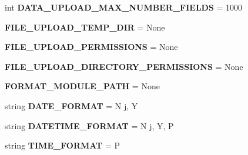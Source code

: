 \begin{DoxyCompactItemize}
int {\bfseries D\+A\+T\+A\+\_\+\+U\+P\+L\+O\+A\+D\+\_\+\+M\+A\+X\+\_\+\+N\+U\+M\+B\+E\+R\+\_\+\+F\+I\+E\+L\+DS} = 1000
\item 
\mbox{\label{namespacedjango_1_1conf_1_1global__settings_aba21f2798fd51fcd1d7528d8f3f74ca1}} 
{\bfseries F\+I\+L\+E\+\_\+\+U\+P\+L\+O\+A\+D\+\_\+\+T\+E\+M\+P\+\_\+\+D\+IR} = None
\item 
\mbox{\label{namespacedjango_1_1conf_1_1global__settings_a77a0343fa3953a447ce867f8fa868dda}} 
{\bfseries F\+I\+L\+E\+\_\+\+U\+P\+L\+O\+A\+D\+\_\+\+P\+E\+R\+M\+I\+S\+S\+I\+O\+NS} = None
\item 
\mbox{\label{namespacedjango_1_1conf_1_1global__settings_a0ad35f04ec5c69084a8c6962096c7b32}} 
{\bfseries F\+I\+L\+E\+\_\+\+U\+P\+L\+O\+A\+D\+\_\+\+D\+I\+R\+E\+C\+T\+O\+R\+Y\+\_\+\+P\+E\+R\+M\+I\+S\+S\+I\+O\+NS} = None
\item 
\mbox{\label{namespacedjango_1_1conf_1_1global__settings_ad9c093a8b08391a2fdc05f10c2df32d6}} 
{\bfseries F\+O\+R\+M\+A\+T\+\_\+\+M\+O\+D\+U\+L\+E\+\_\+\+P\+A\+TH} = None
\item 
\mbox{\label{namespacedjango_1_1conf_1_1global__settings_a56eda7f9f12fe4b75bc4e57cc3fec33c}} 
string {\bfseries D\+A\+T\+E\+\_\+\+F\+O\+R\+M\+AT} = \textquotesingle{}N j, Y\textquotesingle{}
\item 
\mbox{\label{namespacedjango_1_1conf_1_1global__settings_a3ff24f61b4d5925ba4f949f450578aa8}} 
string {\bfseries D\+A\+T\+E\+T\+I\+M\+E\+\_\+\+F\+O\+R\+M\+AT} = \textquotesingle{}N j, Y, P\textquotesingle{}
\item 
\mbox{\label{namespacedjango_1_1conf_1_1global__settings_a96489d785e12506cd963b6043d7e2594}} 
string {\bfseries T\+I\+M\+E\+\_\+\+F\+O\+R\+M\+AT} = \textquotesingle{}P\textquotesingle{}
\item 
\mbox{\label{namespacedjango_1_1conf_1_1global__settings_acf1777506230d1afaa189fa481054d6e}} 

\end{DoxyCompactItemize}
